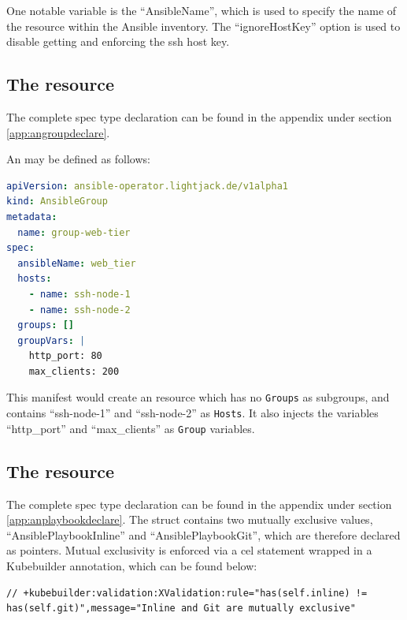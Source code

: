 One notable variable is the \enquote{AnsibleName}, which is used to specify the name of the resource within the Ansible inventory.
The \enquote{ignoreHostKey} option is used to disable getting and enforcing the \gls{ssh} host key.

\clearpage
\subsection{The \angroup resource}
The complete \angroup spec type declaration can be found in the appendix under section \ref{app:angroupdeclare}.

An \angroup may be defined as follows:

\begin{lstlisting}[language=yaml,caption=Example \angroup definition]
apiVersion: ansible-operator.lightjack.de/v1alpha1
kind: AnsibleGroup
metadata:
  name: group-web-tier
spec:
  ansibleName: web_tier
  hosts:
    - name: ssh-node-1
    - name: ssh-node-2
  groups: []
  groupVars: |
    http_port: 80
    max_clients: 200
\end{lstlisting}

This manifest would create an \angroup resource which has no \texttt{Groups} as subgroups, and contains \enquote{ssh-node-1} and \enquote{ssh-node-2} as \texttt{Hosts}.
It also injects the variables \enquote{http\_port} and \enquote{max\_clients} as \texttt{Group} variables.

\clearpage
\subsection{The \anplaybook resource}
The complete \anplaybook spec type declaration can be found in the appendix under section \ref{app:anplaybookdeclare}.
The \anplaybook struct contains two mutually exclusive values, \enquote{AnsiblePlaybookInline} and \enquote{AnsiblePlaybookGit}, which are therefore declared as pointers.
Mutual exclusivity is enforced via a \gls{cel} statement wrapped in a Kubebuilder annotation, which can be found below:

\begin{lstlisting}[caption=Kubebuilder CEL annotation for enforcing mutual exclusivity between inline and Git \texttt{Playbook} sources]
// +kubebuilder:validation:XValidation:rule="has(self.inline) != has(self.git)",message="Inline and Git are mutually exclusive"
\end{lstlisting}

